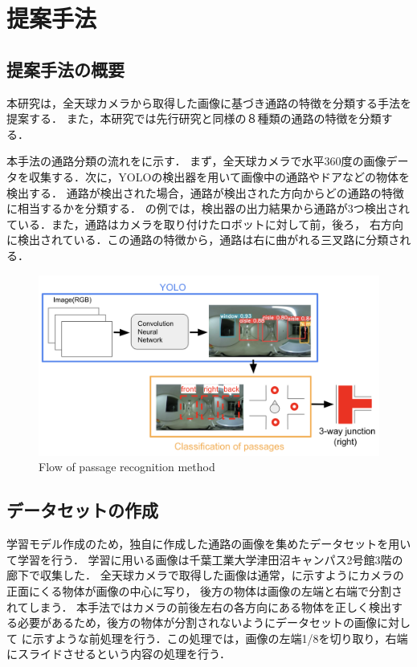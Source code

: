 \documentclass[../main]{subfiles}
\begin{document}
    \setcounter{secnumdepth}{2}
    \chapter{提案手法}
        \section{提案手法の概要}
        本研究は，全天球カメラから取得した画像に基づき通路の特徴を分類する手法を提案する．
        また，本研究では先行研究と同様の８種類の通路の特徴を分類する．

        
        本手法の通路分類の流れをに示す．
        まず，全天球カメラで水平360度の画像データを収集する．次に，YOLOの検出器を用いて画像中の通路やドアなどの物体を検出する．
        通路が検出された場合，通路が検出された方向からどの通路の特徴に相当するかを分類する．
        の例では，検出器の出力結果から通路が3つ検出されている．また，通路はカメラを取り付けたロボットに対して前，後ろ，
        右方向に検出されている．この通路の特徴から，通路は右に曲がれる三叉路に分類される．
        
        \begin{figure}[H]
            \centering
            \includegraphics[scale=0.45]{../images/proposed_method.png}
            \caption{Flow of passage recognition method}
            \label{figure::proposed_method}
        \end{figure}

        \newpage

        \section{データセットの作成}
        学習モデル作成のため，独自に作成した通路の画像を集めたデータセットを用いて学習を行う．
        学習に用いる画像は千葉工業大学津田沼キャンパス2号館3階の廊下で収集した．
        全天球カメラで取得した画像は通常，に示すようにカメラの正面にくる物体が画像の中心に写り，
        後方の物体は画像の左端と右端で分割されてしまう．
        本手法ではカメラの前後左右の各方向にある物体を正しく検出する必要があるため，後方の物体が分割されないようにデータセットの画像に対して
        に示すような前処理を行う．この処理では，画像の左端1/8を切り取り，右端にスライドさせるという内容の処理を行う．
\end{document}
